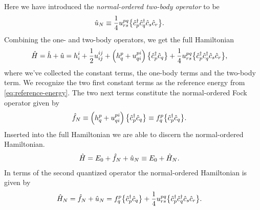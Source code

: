         Here we have introduced the \emph{normal-ordered two-body operator} to
        be
        \begin{align}
            \hat{u}_N
            &\equiv
            \frac{1}{4}u^{pq}_{rs}\bigl\{ 
                \hat{c}_{p}^{\dagger}
                \hat{c}_{q}^{\dagger}
                \hat{c}_{s}
                \hat{c}_{r}
             \bigr\}.
        \end{align}
        Combining the one- and two-body operators, we get the full Hamiltonian
        \begin{align}
            \hat{H}
            &=
            \hat{h} + \hat{u}
            =
            h^{i}_{i}
            + \frac{1}{2} u^{ij}_{ij}
            + \left( 
                h^{p}_{q}
                +
                u^{pi}_{qi}
             \right)
            \bigl\{ 
                \hat{c}_{p}^{\dagger}
                \hat{c}_{q}
             \bigr\}
            +
            \frac{1}{4}u^{pq}_{rs}
            \bigl\{ 
                \hat{c}_{p}^{\dagger}
                \hat{c}_{q}^{\dagger}
                \hat{c}_{s}
                \hat{c}_{r}
             \bigr\},
        \end{align}
        where we've collected the constant terms, the one-body terms and the
        two-body term.
        We recognize the two first constant terms as the reference energy from
        \autoref{eq:reference-energy}.
        The two next terms constitute the normal-ordered Fock operator given by
        \begin{align}
            \hat{f}_N
            &\equiv
            \left( 
                h^{p}_{q}
                +
                u^{pi}_{qi}
             \right)
            \bigl\{ 
                \hat{c}_{p}^{\dagger}
                \hat{c}_{q}
             \bigr\}
            \equiv
            f^{p}_{q}
            \bigl\{ 
                \hat{c}_{p}^{\dagger}
                \hat{c}_{q}
             \bigr\}.
        \end{align}
        Inserted into the full Hamiltonian we are able to discern the
        normal-ordered Hamiltonian.
        \begin{align}
            \hat{H}
            &=
            E_{0}
            +
            \hat{f}_N
            +
            \hat{u}_N
            \equiv
            E_{0}
            +
            \hat{H}_N.
        \end{align}
        In terms of the second quantized operator the normal-ordered Hamiltonian
        is given by
        \begin{align}
            \hat{H}_N
            &=
            \hat{f}_N + \hat{u}_N
            =
            f^{p}_{q}\bigl\{ 
                \hat{c}_{p}^{\dagger}
                \hat{c}_{q}
             \bigr\}
            +
            \frac{1}{4}
            u^{pq}_{rs}\bigl\{ 
                \hat{c}_{p}^{\dagger}
                \hat{c}_{q}^{\dagger}
                \hat{c}_{s}
                \hat{c}_{r}
             \bigr\}.
        \end{align}
